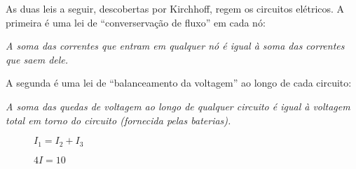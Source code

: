 \documentclass{beamer}
\begin{document}
    \begin{frame}
        As duas leis a seguir, descobertas por Kirchhoff, \pause regem os circuitos elétricos. \pause A primeira é uma lei de ``converservação de fluxo'' em cada nó:\pause

        \vspace{1.5cm}
        \begin{tcolorbox}[colback=green!30, colframe=green!80!blue, title=Lei da Corrente (nós)]
            \textit{A soma das correntes que entram em qualquer nó \pause é igual à soma das correntes que saem dele.}
        \end{tcolorbox}
    \end{frame}

    \begin{frame}
        A segunda é uma lei de ``balanceamento da voltagem'' ao longo de cada circuito:\pause

        \vspace{1.5cm}
        
        \begin{tcolorbox}[colback=green!30, colframe=green!80!blue, title=Lei da Voltagem (circuitos)]
            \textit{A soma das quedas de voltagem ao longo de qualquer circuito \pause é igual à voltagem total em torno do circuito (fornecida pelas baterias).}
        \end{tcolorbox}
    \end{frame}

    \begin{frame}
        \begin{figure}[!h]
            \centering
            
            \caption{$I_1 = I_2 + I_3$}
        \end{figure}
    \end{frame}

    \begin{frame}
        \begin{figure}[!h]
            \centering
            
            \caption{$4I = 10$}
        \end{figure}
    \end{frame}

    \begin{frame}
        \begin{figure}[!h]
            \centering
            
        \end{figure}
    \end{frame}
\end{document}
